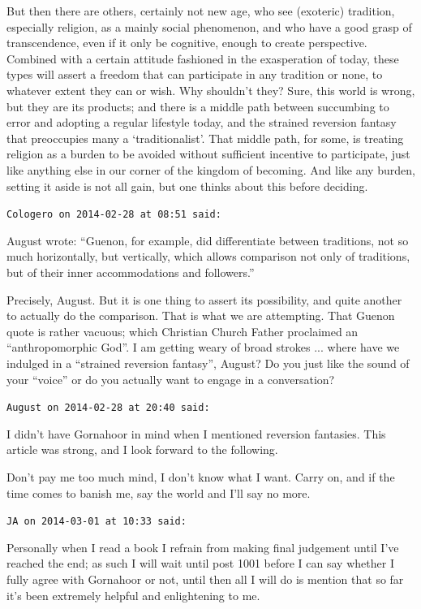 \begin{footnotesize}
\begin{sffamily}
But then there are others, certainly not new age, who see (exoteric) tradition, especially religion, as a mainly social phenomenon, and who have a good grasp of transcendence, even if it only be cognitive, enough to create perspective. Combined with a certain attitude fashioned in the exasperation of today, these types will assert a freedom that can participate in any tradition or none, to whatever extent they can or wish. Why shouldn't they? Sure, this world is wrong, but they are its products; and there is a middle path between succumbing to error and adopting a regular lifestyle today, and the strained reversion fantasy that preoccupies many a `traditionalist'. That middle path, for some, is treating religion as a burden to be avoided without sufficient incentive to participate, just like anything else in our corner of the kingdom of becoming. And like any burden, setting it aside is not all gain, but one thinks about this before deciding.

\hfill

\texttt{Cologero on 2014-02-28 at 08:51 said:}

August wrote: ``Guenon, for example, did differentiate between traditions, not so much horizontally, but vertically, which allows comparison not only of traditions, but of their inner accommodations and followers.''

Precisely, August. But it is one thing to assert its possibility, and quite another to actually do the comparison. That is what we are attempting. That Guenon quote is rather vacuous; which Christian Church Father proclaimed an ``anthropomorphic God''. I am getting weary of broad strokes ... where have we indulged in a ``strained reversion fantasy'', August? Do you just like the sound of your ``voice'' or do you actually want to engage in a conversation?

\hfill

\texttt{August on 2014-02-28 at 20:40 said:}

I didn't have Gornahoor in mind when I mentioned reversion fantasies. This article was strong, and I look forward to the following.

Don't pay me too much mind, I don't know what I want. Carry on, and if the time comes to banish me, say the world and I'll say no more.

\hfill

\texttt{JA on 2014-03-01 at 10:33 said:}

Personally when I read a book I refrain from making final judgement until I've reached the end; as such I will wait until post 1001 before I can say whether I fully agree with Gornahoor or not, until then all I will do is mention that so far it's been extremely helpful and enlightening to me.


\end{sffamily}
\end{footnotesize}
